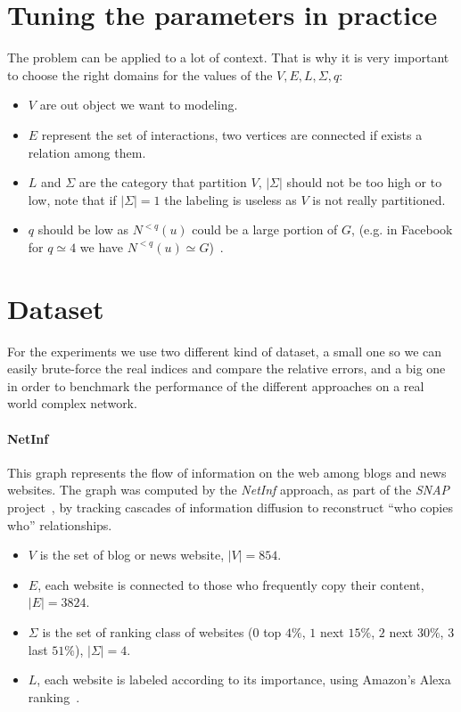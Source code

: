     \section{Tuning the parameters in practice}
    
    The problem can be applied to a lot of context.
    That is why it is very important to choose the right domains for the values of the $V, E, L, \Sigma, q$:
    \begin{itemize}
	    \item $V$ are out object we want to modeling.
	    \item $E$ represent the set of interactions, two vertices are connected if exists a relation among them.
	    \item $L$ and $\Sigma$ are the category that partition $V$, $|\Sigma|$ should not be too high or to low, note that if $|\Sigma| = 1$ the labeling is useless as $V$ is not really partitioned.
	    \item $q$ should be low as $N^{<q}(u)$ could be a large portion of $G$, (e.g. in Facebook for $q \simeq 4$ we have $N^{<q}(u) \simeq G$)~\cite{Facebook}.
    \end{itemize}
    
    
    \section{Dataset}
    
    For the experiments we use two different kind of dataset, a small one so we can easily brute-force the real indices and compare the relative errors, and a big one in order to benchmark the performance of the different approaches on a real world complex network.
    
    \paragraph*{NetInf} This graph represents the flow of information on the web among blogs and news websites. The graph was computed by the \textit{NetInf} approach, as part of the \textit{SNAP} project~\cite{netinf}, by tracking cascades of information diffusion to reconstruct ``who copies who'' relationships.
    
    \begin{itemize}
    	\item $V$ is the set of blog or news website, $|V| = 854$.
    	\item $E$, each website is connected to those who frequently copy their content, $|E| = 3824$.
    	\item $\Sigma$ is the set of ranking class of websites ($0$ top $4\%$, $1$ next $15\%$, $2$ next $30\%$, $3$ last $51\%$), $|\Sigma| = 4$.
    	\item $L$, each website is labeled according to its importance, using Amazon's Alexa ranking~\cite{alexarank}.
    \end{itemize}

